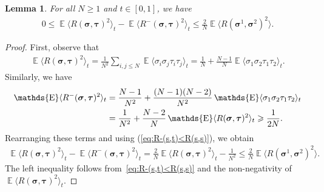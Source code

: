 \documentclass[letterpaper,11pt,reqno]{amsart}
\newtheorem{lem}[thm]{Lemma}
\renewcommand{\ge}{\geqslant}
\renewcommand{\leq}{\leqslant}
\renewcommand{\geq}{\geqslant}
\newcommand{\ra}{\rangle}
\newcommand{\la}{\langle}
\newcommand{\mvgs}{\boldsymbol{\sigma}}\newcommand{\mvgS}{\boldsymbol{\Sigma}}\newcommand{\mvgt}{\boldsymbol{\tau}}
\DeclareMathOperator{\E}{\mathds{E}}
\begin{document}
\begin{lem}\label{lem:1st_deriv_2}
For all \(N \geq 1\) and \(t \in [0,1]\), we have
    \begin{align*}
        0 \leq \E\la R(\mvgs, \mvgt)^2 \ra_{t} -\E\la R^-(\mvgs, \mvgt)^2 \ra_{t} 
        \leq \frac{2}{N} \E\la R(\mvgs^1, \mvgs^2)^2 \ra.
    \end{align*}
\end{lem}
\begin{proof}
    First, observe that
    \begin{align*}
        \E\la R(\mvgs, \mvgt)^2 \ra_{t}
        = \frac{1}{N^2} \sum_{i,j \leq N} \E \la \sigma_i \sigma_j \tau_i \tau_j \ra_{t}
        = \frac{1}{N} + \frac{N-1}{N} \E \la \sigma_1 \sigma_2 \tau_1 \tau_2 \ra_{t}.
    \end{align*}
    Similarly, we have
    \begin{align}
        \E\la R^-(\mvgs, \mvgt)^2 \ra_{t}
        &= \frac{N-1}{N^2} + \frac{(N-1)(N-2)}{N^2} \E \la \sigma_1 \sigma_2 \tau_1 \tau_2 \ra_{t} \notag\\
        &= \frac{1}{N^2}+\frac{N-2}{N} \E\la R(\mvgs, \mvgt)^2 \ra_{t} \ge \frac1{2N}.\label{eq:R+}
    \end{align}
    Rearranging these terms and using (\ref{eq:R-(s,t)<R(s,s)}), we obtain
    \begin{align*}
        \E\la R(\mvgs, \mvgt)^2 \ra_{t} - \E\la R^-(\mvgs, \mvgt)^2 \ra_{t}
        = \frac{2}{N} \E\la R(\mvgs, \mvgt)^2 \ra_{t} - \frac{1}{N^2} 
        \leq \frac{2}{N} \E\la R(\mvgs^1, \mvgs^2)^2 \ra.
    \end{align*}
    The left inequality follows from~\eqref{eq:R-(s,t)<R(s,s)} and the non-negativity of \(\E\la R(\mvgs,\mvgt)^2\ra_t\).
\end{proof}
\end{document}
